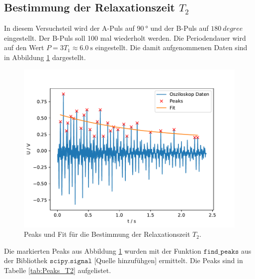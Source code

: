 \subsection{Bestimmung der Relaxationszeit $T_{\text{2}}$}
In diesem Versuchsteil wird der A-Puls auf $\SI{90}{\degree}$ und der B-Puls auf $\SI{180}{degree}$ eingestellt. Der B-Puls
soll 100 mal wiederholt werden.
Die Periodendauer wird auf den Wert $P=3T_{\text{1}}\approx \SI{6.0}{\second}$ eingestellt. Die damit aufgenommenen Daten sind in 
Abbildung \ref{fig:T2_Data_Fit} dargestellt.
\begin{figure}
  \centering
  \includegraphics[width = \textwidth, keepaspectratio]{figure/T2_Data_fit.pdf}
  \caption{Peaks und Fit für die Bestimmung der Relaxationszeit $T_{\text{2}}$.}
  \label{fig:T2_Data_Fit}
\end{figure}
Die markierten Peaks aus Abbildung \ref{fig:T2_Data_Fit} wurden mit der Funktion $\texttt{find\_peaks}$ aus der Bibliothek
$\texttt{scipy.signal}$ [Quelle hinzufühgen] ermittelt.
Die Peaks sind in Tabelle \ref{tab:Peaks_T2} aufgelistet.

